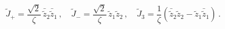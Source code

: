 \begin{equation}
\tilde{J}_{+} = \frac{\sqrt{2}}{\zeta}\,
\bar{\tilde{z}}_2\bar{\tilde{z}}_1\,,\quad
\tilde{J}_{-} = \frac{\sqrt{2}}{\zeta}\,\tilde{z}_1\tilde{z}_2\,,\quad
\tilde{J}_{3} = \frac{1}{\zeta}\left( \bar{\tilde{z}}_2\tilde{z}_2 
- \tilde{z}_1\bar{\tilde{z}}_1\right)\,.\label{eq:4.1.22}
\end{equation}

